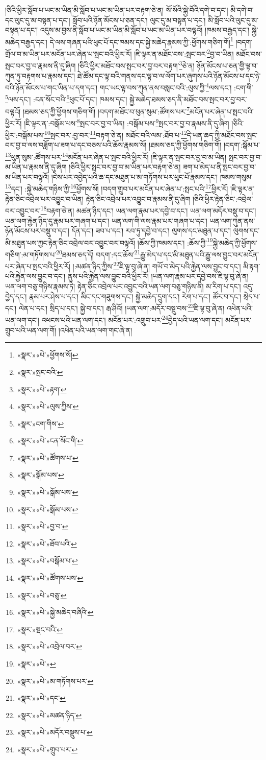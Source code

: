 །ཅིའི་ཕྱིར་སློབ་པ་ཡང་མ་ཡིན་མི་སློབ་པ་ཡང་མ་ཡིན་པར་བརྟག་ཅེ་ན། སོ་སོའི་སྐྱེ་བོའི་དགེ་བ་དང་། མི་དགེ་བ་དང་ལུང་དུ་མ་བསྟན་པ་དང་། སློབ་པའི་ཉོན་མོངས་པ་ཅན་དང་། ལུང་དུ་མ་བསྟན་པ་དང་། མི་སློབ་པའི་ལུང་དུ་མ་བསྟན་པ་དང་། འདུས་མ་བྱས་ནི་སློབ་པ་ཡང་མ་ཡིན་མི་སློབ་པ་ཡང་མ་ཡིན་པར་བལྟའོ། །ཁམས་བརྒྱད་དང་། སྐྱེ་མཆེད་བརྒྱད་དང་། དེ་ལས་གཞན་པའི་ཕུང་པོ་དང་ཁམས་དང་སྐྱེ་མཆེད་རྣམས་ཀྱི་:ཕྱོགས་གཅིག་གོ།\footnote{«སྣར་»«པེ་»ཕྱོགས་སོ།} །བདག་གྲོལ་བ་མ་ཡིན་པར་མངོན་པར་ཞེན་པ་སྤང་བའི་ཕྱིར་རོ། །ཇི་ལྟར་ན་མཐོང་བས་:སྤང་བར་\footnote{«སྣར་»སྤང་བའི་}བྱ་བ་ཡིན། མཐོང་བས་སྤང་བར་བྱ་བ་རྣམས་ནི་དུ་ཞིག །ཅིའི་ཕྱིར་མཐོང་བས་སྤང་བར་བྱ་བར་བརྟག་\footnote{«སྣར་»«པེ་»རྟག་}ཅེ་ན། ཉོན་མོངས་པ་ཅན་གྱི་ལྟ་བ་ཀུན་ཏུ་བརྟགས་པ་རྣམས་དང་། ཐེ་ཚོམ་དང་ལྟ་བའི་གནས་དང་ལྟ་བ་ལ་ལོག་པར་ཞུགས་པའི་ཉོན་མོངས་པ་དང་ཉེ་བའི་ཉོན་མོངས་པ་གང་ཡིན་པ་དག་དང་། གང་ཡང་ལྟ་བས་ཀུན་ནས་བསླང་བའི་:ལུས་ཀྱི་\footnote{«སྣར་»«པེ་»ལུས་ཀྱིས་}ལས་དང་། :ངག་གི་\footnote{«སྣར་»ངག་གིས་}ལས་དང་། :ངན་སོང་བའི་\footnote{«སྣར་»«པེ་»ངན་སོང་གི་}ཕུང་པོ་དང་། ཁམས་དང་། སྐྱེ་མཆེད་ཐམས་ཅད་ནི་མཐོང་བས་སྤང་བར་བྱ་བར་བལྟའོ། །ཐམས་ཅད་ཀྱི་ཕྱོགས་གཅིག་གོ། །བདག་མཐོང་བ་ཕུན་སུམ་:ཚོགས་པར་\footnote{«སྣར་»«པེ་»ཚོགས་པ་}མངོན་པར་ཞེན་པ་སྤང་བའི་ཕྱིར་རོ། །ཇི་ལྟར་ན་:བསྒོམ་པས་\footnote{«སྣར་»སྒོམ་པས་}སྤང་བར་བྱ་བ་ཡིན། :བསྒོམ་པས་\footnote{«སྣར་»«པེ་»སྒོམ་པས་}སྤང་བར་བྱ་བ་རྣམས་ནི་དུ་ཞིག །ཅིའི་ཕྱིར་:བསྒོམ་པས་\footnote{«སྣར་»«པེ་»སྒོམ་པས་}སྤང་བར་:བྱ་བར་\footnote{«སྣར་»«པེ་»བྱ་བ་}བརྟག་ཅེ་ན། མཐོང་བའི་ལམ་:ཐོབ་པ་\footnote{«སྣར་»«པེ་»ཐོབ་པའི་}དེ་ཡན་ཆད་ཀྱི་མཐོང་བས་སྤང་བར་བྱ་བ་ལས་བཟློག་པ་ཟག་པ་དང་བཅས་པའི་ཆོས་རྣམས་སོ། །ཐམས་ཅད་ཀྱི་ཕྱོགས་གཅིག་གོ། །བདག་:སྒོམ་པ་\footnote{«སྣར་»«པེ་»བསྒོམ་པ་}ཕུན་སུམ་:ཚོགས་པར་\footnote{«སྣར་»«པེ་»ཚོགས་པས་}མངོན་པར་ཞེན་པ་སྤང་བའི་ཕྱིར་རོ། །ཇི་ལྟར་ན་སྤང་བར་བྱ་བ་མ་ཡིན། སྤང་བར་བྱ་བ་མ་ཡིན་པ་རྣམས་ནི་དུ་ཞིག །ཅིའི་ཕྱིར་སྤང་བར་བྱ་བ་མ་ཡིན་པར་བརྟག་ཅེ་ན། ཟག་པ་མེད་པ་ནི་སྤང་བར་བྱ་བ་མ་ཡིན་པར་བལྟའོ། །ངེས་པར་འབྱེད་པའི་ཆ་དང་མཐུན་པ་མ་གཏོགས་པར་ཕུང་པོ་རྣམས་དང་། ཁམས་གསུམ་\footnote{«སྣར་»«པེ་»བཅུ་}དང་། :སྐྱེ་མཆེད་གཉིས་ཀྱི་\footnote{«སྣར་»«པེ་»སྐྱེ་མཆེད་བཞིའི་}ཕྱོགས་སོ། །བདག་གྲུབ་པར་མངོན་པར་ཞེན་པ་:སྤང་པའི་\footnote{«སྣར་»སྡང་བའི་}ཕྱིར་རོ། །ཇི་ལྟར་ན་རྟེན་ཅིང་འབྲེལ་པར་འབྱུང་བ་ཡིན། རྟེན་ཅིང་འབྲེལ་པར་འབྱུང་བ་རྣམས་ནི་དུ་ཞིག །ཅིའི་ཕྱིར་རྟེན་ཅིང་:འབྲེལ་བར་འབྱུང་བར་\footnote{«སྣར་»«པེ་»འབྲེལ་བར་}བརྟག་ཅེ་ན། མཚན་ཉིད་དང་། ཡན་ལག་རྣམ་པར་དབྱེ་བ་དང་། ཡན་ལག་མདོར་བསྡུ་བ་དང་། ཡན་ལག་རྐྱེན་ཉིད་དུ་རྣམ་པར་གཞག་པ་དང་། ཡན་ལག་གི་ལས་རྣམ་པར་གཞག་པ་དང་། ཡན་ལག་ཀུན་ནས་ཉོན་མོངས་པར་བསྡུ་བ་དང་། དོན་དང་། ཟབ་པ་དང་། རབ་ཏུ་དབྱེ་བ་དང་། ལུགས་དང་མཐུན་པ་དང་། ལུགས་དང་མི་མཐུན་པས་ཀྱང་རྟེན་ཅིང་འབྲེལ་བར་འབྱུང་བར་བལྟའོ། །ཆོས་ཀྱི་ཁམས་དང་། :ཆོས་ཀྱི་\footnote{«སྣར་»«པེ་»}སྐྱེ་མཆེད་ཀྱི་ཕྱོགས་གཅིག་:མ་གཏོགས་པ་\footnote{«སྣར་»«པེ་»མ་གཏོགས་པར་}ཐམས་ཅད་དོ། བདག་:དང་ཆོས་\footnote{«སྣར་»«པེ་»དང་}རྒྱུ་མེད་པ་དང་མི་མཐུན་པའི་རྒྱུ་ལས་བྱུང་བར་མངོན་པར་ཞེན་པ་སྤང་བའི་ཕྱིར་རོ། །:མཚན་ཉིད་ཀྱིས་\footnote{«སྣར་»«པེ་»མཚན་ཉིད་}ཇི་ལྟ་བུ་ཞེ་ན། གཡོ་བ་མེད་པའི་རྐྱེན་ལས་བྱུང་བ་དང་། མི་རྟག་པའི་རྐྱེན་ལས་བྱུང་བ་དང་། ནུས་པའི་རྐྱེན་ལས་བྱུང་བའི་ཕྱིར་རོ། །ཡན་ལག་རྣམ་པར་དབྱེ་བས་ཇི་ལྟ་བུ་ཞེ་ན། ཡན་ལག་བཅུ་གཉིས་རྣམས་ཏེ། རྟེན་ཅིང་འབྲེལ་པར་འབྱུང་བའི་ཡན་ལག་བཅུ་གཉིས་ནི། མ་རིག་པ་དང་། འདུ་བྱེད་དང་། རྣམ་པར་ཤེས་པ་དང་། མིང་དང་གཟུགས་དང་། སྐྱེ་མཆེད་དྲུག་དང་། རེག་པ་དང་། ཚོར་བ་དང་། སྲེད་པ་དང་། ལེན་པ་དང་། སྲིད་པ་དང་། སྐྱེ་བ་དང་། རྒ་ཤིའོ། །ཡན་ལག་:མདོར་བསྡུ་བས་\footnote{«སྣར་»«པེ་»མདོར་བསྡུས་པ་}ཇི་ལྟ་བུ་ཞེ་ན། འཕེན་པའི་ཡན་ལག་དང་། འཕངས་པའི་ཡན་ལག་དང་། མངོན་པར་:འགྲུབ་པར་\footnote{«སྣར་»«པེ་»གྲུབ་པར་}བྱེད་པའི་ཡན་ལག་དང་། མངོན་པར་གྲུབ་པའི་ཡན་ལག་གོ། །འཕེན་པའི་ཡན་ལག་གང་ཞེ་ན། 